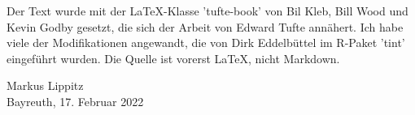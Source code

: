 Der Text wurde mit der LaTeX-Klasse 'tufte-book' von Bil Kleb, Bill Wood und Kevin Godby gesetzt, die sich der Arbeit von Edward Tufte annähert. Ich habe viele der Modifikationen angewandt, die von Dirk Eddelbüttel im R-Paket 'tint' eingeführt wurden. Die Quelle ist vorerst LaTeX, nicht Markdown.




\vspace{2\baselineskip}

Markus Lippitz \\ Bayreuth, 17. Februar 2022

 
 



